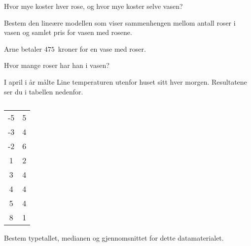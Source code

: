 \begin{oppgaver}
   Hvor mye koster hver rose, og hvor mye koster selve vasen?
\end{oppgaver}

\begin{oppgaver}
   Bestem den lineære modellen som viser sammenhengen mellom antall
    roser i vasen og samlet pris for vasen med rosene.
\end{oppgaver}

Arne betaler $475$~kroner for en vase med roser.

\begin{oppgaver}
   Hvor mange roser har han i vasen?
\end{oppgaver}


\Oppgave[3] 

I april i år målte Line temperaturen utenfor huset sitt hver morgen. Resultatene
ser du i tabellen nedenfor.

\begin{table}[H]
    \centering
    \caption{}
    \label{tab:Forkurs-1p-2p-laererutdanning-2018-V-U-oppgave-1-8}
    \begin{tabular}{|S[table-format=2.0] |S[table-format=1.0]|}
         -5 & 5 \\
         -3 & 4 \\
         -2 & 6 \\
          1 & 2 \\
          3 & 4 \\
          4 & 4 \\
          5 & 4 \\
          8 & 1 \\ \hline
    \end{tabular}
\end{table}

Bestem typetallet, medianen og gjennomsnittet for dette datamaterialet.


\newpage
\Oppgave[2]


